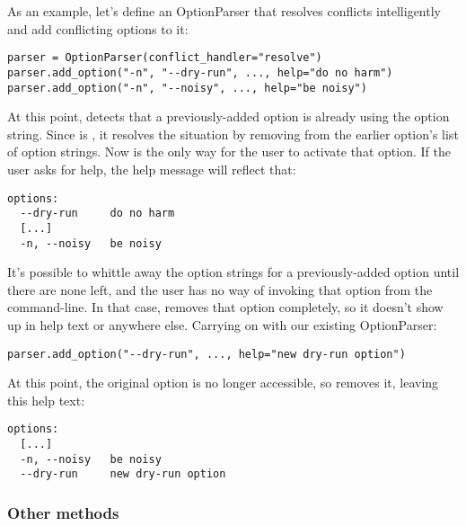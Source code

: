 As an example, let's define an OptionParser that resolves conflicts
intelligently and add conflicting options to it:
\begin{verbatim}
parser = OptionParser(conflict_handler="resolve")
parser.add_option("-n", "--dry-run", ..., help="do no harm")
parser.add_option("-n", "--noisy", ..., help="be noisy")
\end{verbatim}

At this point,  detects that a previously-added option is already
using the  option string.  Since  is
, it resolves the situation by removing  from the
earlier option's list of option strings.  Now  is the
only way for the user to activate that option.  If the user asks for
help, the help message will reflect that:
\begin{verbatim}
options:
  --dry-run     do no harm
  [...]
  -n, --noisy   be noisy
\end{verbatim}

It's possible to whittle away the option strings for a previously-added
option until there are none left, and the user has no way of invoking
that option from the command-line.  In that case,  removes that
option completely, so it doesn't show up in help text or anywhere else.
Carrying on with our existing OptionParser:
\begin{verbatim}
parser.add_option("--dry-run", ..., help="new dry-run option")
\end{verbatim}

At this point, the original  option is no longer
accessible, so  removes it, leaving this help text:
\begin{verbatim}
options:
  [...]
  -n, --noisy   be noisy
  --dry-run     new dry-run option
\end{verbatim}


\subsubsection{Other methods\label{optparse-other-methods}}

